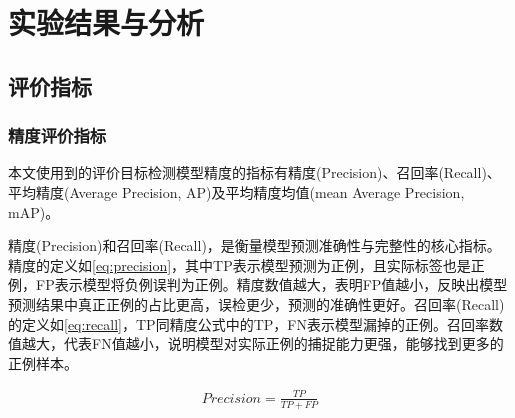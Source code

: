 \chapter{实验结果与分析}

\section{评价指标}

\subsection{精度评价指标}
本文使用到的评价目标检测模型精度的指标有精度(Precision)、召回率(Recall)、平均精度(Average Precision, AP)及平均精度均值(mean Average Precision, mAP)。


精度(Precision)和召回率(Recall)，是衡量模型预测准确性与完整性的核心指标。精度的定义如\ref{eq:precision}，其中TP表示模型预测为正例，且实际标签也是正例，FP表示模型将负例误判为正例。精度数值越大，表明FP值越小，反映出模型预测结果中真正正例的占比更高，误检更少，预测的准确性更好。召回率(Recall)的定义如\ref{eq:recall}，TP同精度公式中的TP，FN表示模型漏掉的正例。召回率数值越大，代表FN值越小，说明模型对实际正例的捕捉能力更强，能够找到更多的正例样本。


\begin{equation}
    \begin{aligned}
    Precision = \frac{TP}{TP + FP}\label{eq:precision}
    \end{aligned}
\end{equation}


